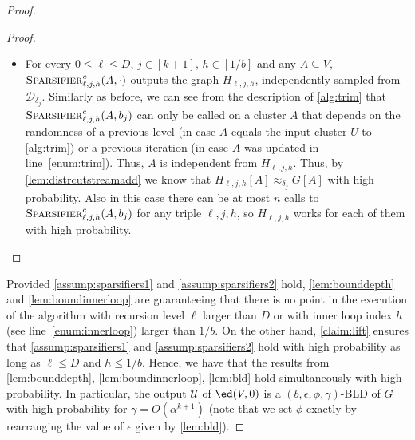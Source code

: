 \begin{proof}
\begin{proof}
\begin{itemize}
			\item For every $0 \le \ell \le D,\,j \in[k+1],\,h \in [1/b]$ and any $A \subseteq V$, $\textsc{Sparsifier}^c_{\ell,j,h}(A,\cdot)$ outputs the graph $H_{\ell,j,h}$, independently sampled from $\mathcal{D}_{\delta_j}$. Similarly as before, we can see from the description of \cref{alg:trim} that $\textsc{Sparsifier}^c_{\ell,j,h}(A,b_j)$ can only be called on a cluster $A$ that depends on the randomness of a previous level (in case $A$ equals the input cluster $U$ to \cref{alg:trim}) or a previous iteration (in case $A$ was updated in line~\eqref{enum:trim}). Thus, $A$ is independent from $H_{\ell,j,h}$. Thus, by \cref{lem:distrcutstreamadd} we know that $H_{\ell,j,h}[A] \approx_{\delta_j} G[A]$ with high probability. Also in this case there can be at most $n$ calls to $\textsc{Sparsifier}^c_{\ell,j,h}(A,b_j)$ for any triple $\ell,j,h$, so $H_{\ell,j,h}$ works for each of them with high probability.
		\end{itemize}
	\end{proof}
	\noindent
	Provided  \cref{assump:sparsifiers1} and \cref{assump:sparsifiers2} hold, \cref{lem:bounddepth} and \cref{lem:boundinnerloop} are guaranteeing that there is no point in the execution of the algorithm with recursion level $\ell$ larger than $D$ or with inner loop index $h$ (see line~\eqref{enum:innerloop}) larger than $1/b$. On the other hand, \cref{claim:lift} ensures that \cref{assump:sparsifiers1} and \cref{assump:sparsifiers2} hold with high probability as long as $\ell \le D$ and $h \le 1/b$. Hence, we have that the results from \cref{lem:bounddepth}, \cref{lem:boundinnerloop}, \cref{lem:bld} hold simultaneously with high probability. In particular, the output $\mathcal{U}$ of $\ed(V,0)$
	is a $(b,\epsilon,\phi,\gamma)$-BLD of $G$ with high probability for $\gamma = O(\alpha^{k+1})$ (note that we set $\phi$ exactly by rearranging the value of $\epsilon$ given by \cref{lem:bld}).
	

\end{proof}

